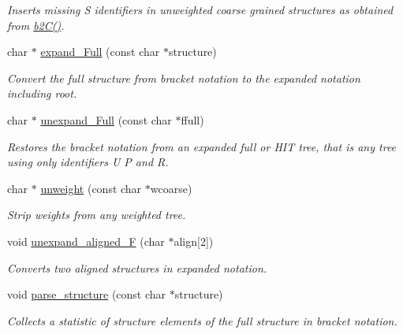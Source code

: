 \begin{DoxyCompactItemize}
\begin{DoxyCompactList}\small\item\em Inserts missing \textquotesingle{}S\textquotesingle{} identifiers in unweighted coarse grained structures as obtained from \mbox{\hyperlink{group__struct__utils_ga9c80d92391f2833549a8b6dac92233f0}{b2\+C()}}. \end{DoxyCompactList}\item 
char $\ast$ \mbox{\hyperlink{group__struct__utils_ga78d73cd54a068ef2812812771cdddc6f}{expand\+\_\+\+Full}} (const char $\ast$structure)
\begin{DoxyCompactList}\small\item\em Convert the full structure from bracket notation to the expanded notation including root. \end{DoxyCompactList}\item 
char $\ast$ \mbox{\hyperlink{group__struct__utils_ga260c4b622093b76a883bf96628280de1}{unexpand\+\_\+\+Full}} (const char $\ast$ffull)
\begin{DoxyCompactList}\small\item\em Restores the bracket notation from an expanded full or H\+IT tree, that is any tree using only identifiers \textquotesingle{}U\textquotesingle{} \textquotesingle{}P\textquotesingle{} and \textquotesingle{}R\textquotesingle{}. \end{DoxyCompactList}\item 
char $\ast$ \mbox{\hyperlink{group__struct__utils_ga09a80253ac7b6bae606871ba7c6e5136}{unweight}} (const char $\ast$wcoarse)
\begin{DoxyCompactList}\small\item\em Strip weights from any weighted tree. \end{DoxyCompactList}\item 
void \mbox{\hyperlink{group__struct__utils_ga1054c4477d53b31d79d4cb132100e87a}{unexpand\+\_\+aligned\+\_\+F}} (char $\ast$align\mbox{[}2\mbox{]})
\begin{DoxyCompactList}\small\item\em Converts two aligned structures in expanded notation. \end{DoxyCompactList}\item 
void \mbox{\hyperlink{group__struct__utils_ga3c79042e6bf6f01706bf30ec9e69e8ac}{parse\+\_\+structure}} (const char $\ast$structure)
\begin{DoxyCompactList}\small\item\em Collects a statistic of structure elements of the full structure in bracket notation. \end{DoxyCompactList}\item 

\end{DoxyCompactItemize}
